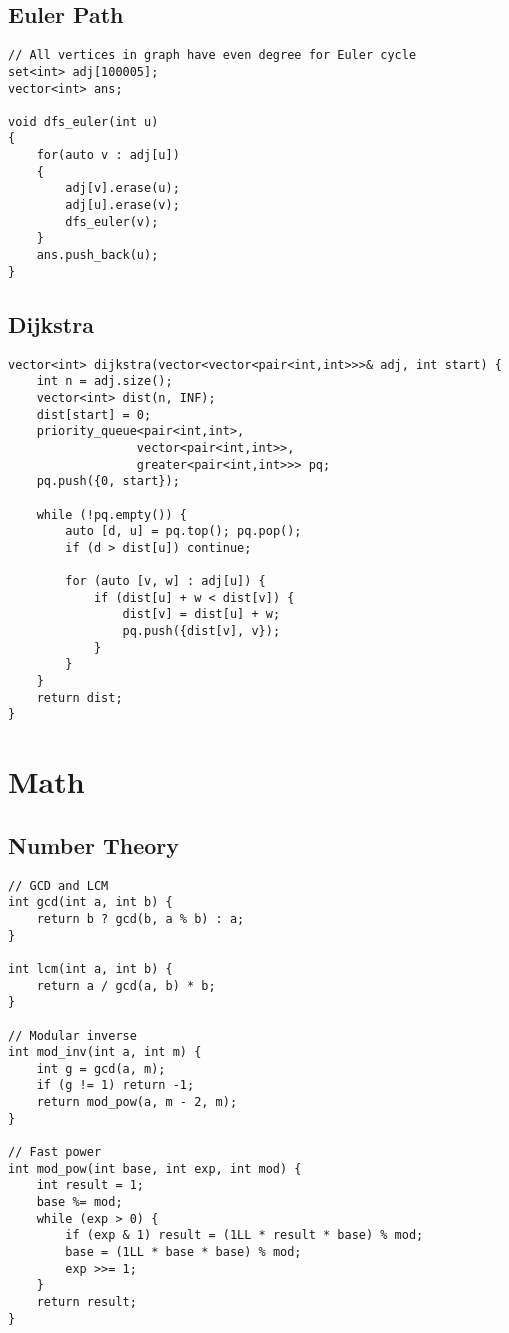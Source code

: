 \documentclass[10pt]{article}
\begin{document}
\begin{landscape}
\begin{multicols}{2}
\subsection{Euler Path}
\begin{lstlisting}[style=cpp]
// All vertices in graph have even degree for Euler cycle
set<int> adj[100005];
vector<int> ans;

void dfs_euler(int u)
{
    for(auto v : adj[u])
    {
        adj[v].erase(u);
        adj[u].erase(v);
        dfs_euler(v);
    }
    ans.push_back(u);
}
\end{lstlisting}

\subsection{Dijkstra}
\begin{lstlisting}[style=cpp]
vector<int> dijkstra(vector<vector<pair<int,int>>>& adj, int start) {
    int n = adj.size();
    vector<int> dist(n, INF);
    dist[start] = 0;
    priority_queue<pair<int,int>, 
                  vector<pair<int,int>>,
                  greater<pair<int,int>>> pq;
    pq.push({0, start});
    
    while (!pq.empty()) {
        auto [d, u] = pq.top(); pq.pop();
        if (d > dist[u]) continue;
        
        for (auto [v, w] : adj[u]) {
            if (dist[u] + w < dist[v]) {
                dist[v] = dist[u] + w;
                pq.push({dist[v], v});
            }
        }
    }
    return dist;
}
\end{lstlisting}

\section{Math}
\subsection{Number Theory}
\begin{lstlisting}[style=cpp]
// GCD and LCM
int gcd(int a, int b) {
    return b ? gcd(b, a % b) : a;
}

int lcm(int a, int b) {
    return a / gcd(a, b) * b;
}

// Modular inverse
int mod_inv(int a, int m) {
    int g = gcd(a, m);
    if (g != 1) return -1;
    return mod_pow(a, m - 2, m);
}

// Fast power
int mod_pow(int base, int exp, int mod) {
    int result = 1;
    base %= mod;
    while (exp > 0) {
        if (exp & 1) result = (1LL * result * base) % mod;
        base = (1LL * base * base) % mod;
        exp >>= 1;
    }
    return result;
}
\end{lstlisting}


\end{multicols}
\end{landscape}
\end{document}
